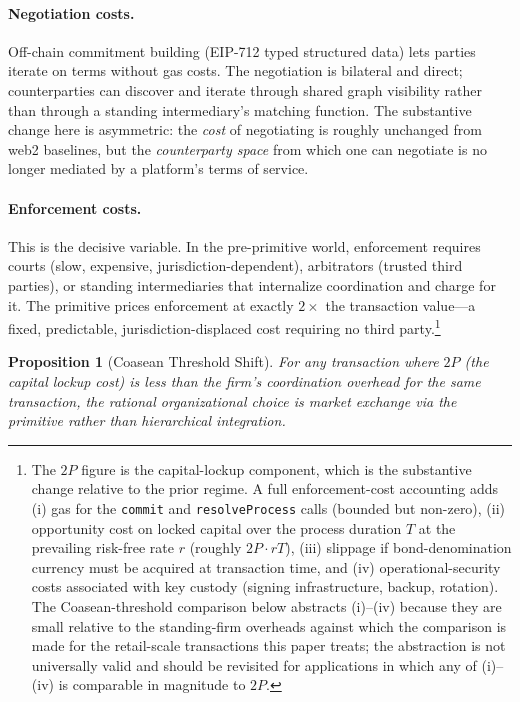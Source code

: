\documentclass[11pt,a4paper]{article}
\newtheorem{proposition}[theorem]{Proposition}
\theoremstyle{definition}
\theoremstyle{remark}
\newcommand{\pay}{P}
\begin{document}
\paragraph{Negotiation costs.}
Off-chain commitment building (EIP-712 typed structured data) lets
parties iterate on terms without gas costs. The negotiation is
bilateral and direct; counterparties can discover and iterate
through shared graph visibility rather than through a standing
intermediary's matching function. The substantive change here is
asymmetric: the \emph{cost} of negotiating is roughly unchanged from
web2 baselines, but the \emph{counterparty space} from which one
can negotiate is no longer mediated by a platform's terms of
service.

\paragraph{Enforcement costs.}
This is the decisive variable. In the pre-primitive world,
enforcement requires courts (slow, expensive,
jurisdiction-dependent), arbitrators (trusted third parties), or
standing intermediaries that internalize coordination and charge
for it. The primitive prices enforcement at exactly $2\times$ the
transaction value---a fixed, predictable, jurisdiction-displaced
cost requiring no third party.\footnote{The $2\pay$ figure is the
capital-lockup component, which is the substantive change relative
to the prior regime. A full enforcement-cost accounting adds
(i) gas for the \texttt{commit} and \texttt{resolveProcess} calls
(bounded but non-zero), (ii) opportunity cost on locked capital
over the process duration $T$ at the prevailing risk-free rate $r$
(roughly $2\pay \cdot rT$), (iii) slippage if bond-denomination
currency must be acquired at transaction time, and
(iv) operational-security costs associated with key custody
(signing infrastructure, backup, rotation). The Coasean-threshold
comparison below abstracts (i)--(iv) because they are small
relative to the standing-firm overheads against which the
comparison is made for the retail-scale transactions this paper
treats; the abstraction is not universally valid and should be
revisited for applications in which any of (i)--(iv) is
comparable in magnitude to $2\pay$.}

\begin{proposition}[Coasean Threshold Shift]
\label{prop:coasean-shift}
For any transaction where $2\pay$ (the capital lockup cost) is
less than the firm's coordination overhead for the same
transaction, the rational organizational choice is market exchange
via the primitive rather than hierarchical integration.
\end{proposition}
\end{document}
